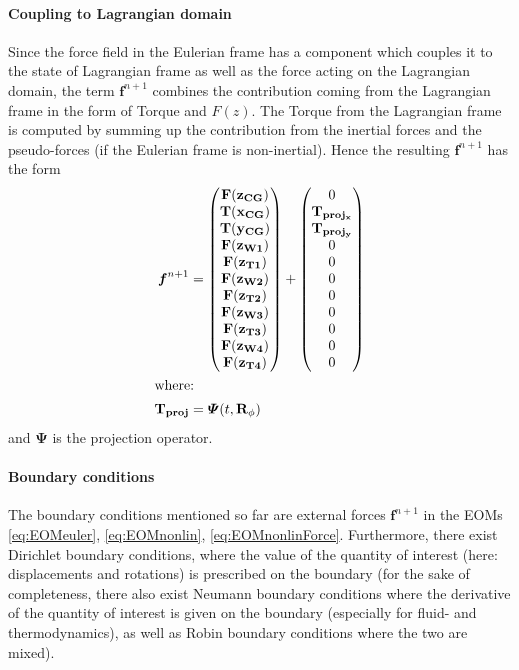 \paragraph{Coupling to Lagrangian domain}\label{par:CoupleEulerLagrange}
Since the force field in the Eulerian frame has a component which couples it to the state of Lagrangian frame as well as the force acting on the Lagrangian domain, the term $\boldsymbol{f}^{n+1}$ combines the contribution coming from the Lagrangian frame in the form of Torque and $F(z)$. The Torque from the Lagrangian frame is computed by summing up the contribution from the inertial forces and the pseudo-forces (if the Eulerian frame is non-inertial). Hence the resulting $\boldsymbol{f}^{n+1}$ has the form
\begin{align}
	\boldsymbol{f}^{n+1} &= \begin{pmatrix} 
		\mathbf{F(z_{CG})}\\
		\mathbf{T(x_{CG})}\\
		\mathbf{T(y_{CG})}\\
		\mathbf{F(z_{W1})}\\
		\mathbf{F(z_{T1})}\\
		\mathbf{F(z_{W2})}\\
		\mathbf{F(z_{T2})}\\
		\mathbf{F(z_{W3})}\\
		\mathbf{F(z_{T3})}\\
		\mathbf{F(z_{W4})}\\
		\mathbf{F(z_{T4})}
	\end{pmatrix} + 
	\begin{pmatrix} 
		0\\
		\mathbf{T_{proj_{x}}}\\
		\mathbf{T_{proj_{y}}}\\
		0\\
		0\\
		0\\
		0\\
		0\\
		0\\
		0\\
		0\\
	\end{pmatrix} \\ \intertext{where:}
	\mathbf{T_{proj}} &= \boldsymbol{\Psi}(t, \mathbf{R}_{\phi})
	\label{eq:f_Eulerian}
\end{align}
and $\boldsymbol{\Psi}$ is the projection operator.

\paragraph{Boundary conditions}
The boundary conditions mentioned so far are external forces $\boldsymbol{f}^{n+1}$ in the EOMs \eqref{eq:EOMeuler}, \eqref{eq:EOMnonlin}, \eqref{eq:EOMnonlinForce}.
Furthermore, there exist Dirichlet boundary conditions, where the value of the quantity of interest (here: displacements and rotations) is prescribed on the boundary (for the sake of completeness, there also exist Neumann boundary conditions where the derivative of the quantity of interest is given on the boundary (especially for fluid- and thermodynamics), as well as Robin boundary conditions where the two are mixed).

